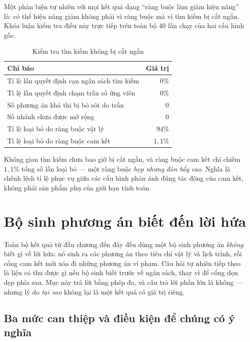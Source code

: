 Một phản biện tự nhiên với mọi kết quả dạng ``ràng buộc làm giảm hiệu năng'' là: có thể hiệu
năng giảm không phải vì ràng buộc mà vì tìm kiếm bị cắt ngắn. Khóa luận kiểm tra điều này trực
tiếp trên toàn bộ 40 lần chạy của hai cấu hình gốc.

\begin{table}[htbp]
\centering
\caption{Kiểm tra tìm kiếm không bị cắt ngắn}
\label{bang:khonggiatao}
\small
\begin{tabular}{@{}lr@{}}
\toprule
\textbf{Chỉ báo} & \textbf{Giá trị}\\
\midrule
Tỉ lệ lần quyết định cạn ngân sách tìm kiếm & $0\%$\\
Tỉ lệ lần quyết định chạm trần số ứng viên & $0\%$\\
Số phương án khả thi bị bỏ sót do trần & 0\\
Số nhánh chưa được mở rộng & 0\\
Tỉ lệ loại bỏ do ràng buộc vật lý & $94\%$\\
Tỉ lệ loại bỏ do ràng buộc cam kết & $1{,}1\%$\\
\bottomrule
\end{tabular}
\end{table}

Không gian tìm kiếm chưa bao giờ bị cắt ngắn, và ràng buộc cam kết chỉ chiếm $1{,}1\%$ tổng số
lần loại bỏ --- một ràng buộc \emph{hẹp nhưng đòn bẩy cao}. Nghĩa là chênh lệch tỉ lệ phục vụ
giữa các cấu hình phản ánh đúng tác động của cam kết, không phải sản phẩm phụ của giới hạn tính
toán.

\section{Bộ sinh phương án biết đến lời hứa}
\label{muc:bosinh}

Toàn bộ kết quả từ đầu chương đến đây đều dùng một bộ sinh phương án \emph{không} biết gì về
lời hứa: nó sinh ra các phương án theo tiêu chí vật lý và lịch trình, rồi cổng cam kết mới xóa
đi những phương án vi phạm. Câu hỏi tự nhiên tiếp theo là liệu có thu được gì nếu bộ sinh biết
trước về ngân sách, thay vì để cổng dọn dẹp phía sau. Mục này trả lời bằng phép đo, và câu trả
lời phần lớn là không --- nhưng lý do \emph{tại sao} không lại là một kết quả có giá trị riêng.

\subsection{Ba mức can thiệp và điều kiện để chúng có ý nghĩa}

